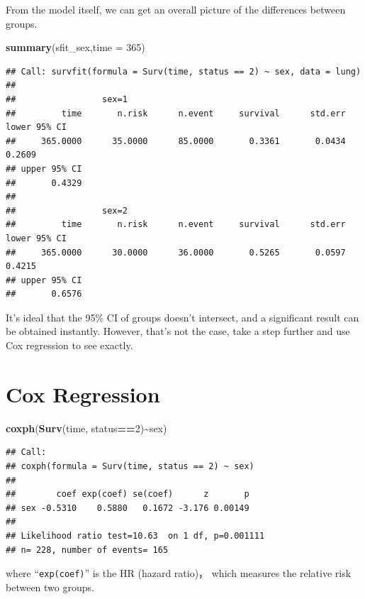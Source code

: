 \documentclass[
]{ctexart}
\newenvironment{Shaded}{\begin{snugshade}}{\end{snugshade}}
\newcommand{\AttributeTok}[1]{\textcolor[rgb]{0.13,0.29,0.53}{#1}}
\newcommand{\DecValTok}[1]{\textcolor[rgb]{0.00,0.00,0.81}{#1}}
\newcommand{\FunctionTok}[1]{\textcolor[rgb]{0.13,0.29,0.53}{\textbf{#1}}}
\newcommand{\NormalTok}[1]{#1}
\newcommand{\SpecialCharTok}[1]{\textcolor[rgb]{0.81,0.36,0.00}{\textbf{#1}}}
\begin{document}
From the model itself, we can get an overall picture of the differences
between groups.

\begin{Shaded}
\begin{Highlighting}[]
\FunctionTok{summary}\NormalTok{(sfit\_sex,}\AttributeTok{time =} \DecValTok{365}\NormalTok{)}
\end{Highlighting}
\end{Shaded}

\begin{verbatim}
## Call: survfit(formula = Surv(time, status == 2) ~ sex, data = lung)
## 
##                 sex=1 
##         time       n.risk      n.event     survival      std.err lower 95% CI 
##     365.0000      35.0000      85.0000       0.3361       0.0434       0.2609 
## upper 95% CI 
##       0.4329 
## 
##                 sex=2 
##         time       n.risk      n.event     survival      std.err lower 95% CI 
##     365.0000      30.0000      36.0000       0.5265       0.0597       0.4215 
## upper 95% CI 
##       0.6576
\end{verbatim}

It's ideal that the 95\% CI of groups doesn't intersect, and a
significant result can be obtained instantly. However, that's not the
case, take a step further and use Cox regression to see exactly.

\hypertarget{cox-regression}{%
\section{Cox Regression}\label{cox-regression}}

\begin{Shaded}
\begin{Highlighting}[]
\FunctionTok{coxph}\NormalTok{(}\FunctionTok{Surv}\NormalTok{(time, status}\SpecialCharTok{==}\DecValTok{2}\NormalTok{)}\SpecialCharTok{\textasciitilde{}}\NormalTok{sex)}
\end{Highlighting}
\end{Shaded}

\begin{verbatim}
## Call:
## coxph(formula = Surv(time, status == 2) ~ sex)
## 
##        coef exp(coef) se(coef)      z       p
## sex -0.5310    0.5880   0.1672 -3.176 0.00149
## 
## Likelihood ratio test=10.63  on 1 df, p=0.001111
## n= 228, number of events= 165
\end{verbatim}

where ``\texttt{exp(coef)}'' is the HR (hazard ratio)， which measures
the relative risk between two groups.
\end{document}
